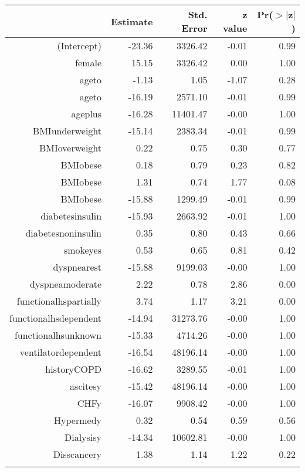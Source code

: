 \bigskip\bigskip
\centering
\begin{tabular}{rrrrr}
  \hline
 & Estimate & Std. Error & z value & Pr($>$$|$z$|$) \\ 
  \hline
(Intercept) & -23.36 & 3326.42 & -0.01 & 0.99 \\ 
  female & 15.15 & 3326.42 & 0.00 & 1.00 \\ 
  age\-65\-to\-74 & -1.13 & 1.05 & -1.07 & 0.28 \\ 
  age\-75\-to\-84 & -16.19 & 2571.10 & -0.01 & 0.99 \\ 
  age\-85\-plus & -16.28 & 11401.47 & -0.00 & 1.00 \\ 
  BMI\-underweight & -15.14 & 2383.34 & -0.01 & 0.99 \\ 
  BMI\-overweight & 0.22 & 0.75 & 0.30 & 0.77 \\ 
  BMI\-obese\-1 & 0.18 & 0.79 & 0.23 & 0.82 \\ 
  BMI\-obese\-2 & 1.31 & 0.74 & 1.77 & 0.08 \\ 
  BMI\-obese\-3 & -15.88 & 1299.49 & -0.01 & 0.99 \\ 
  diabetes\-insulin & -15.93 & 2663.92 & -0.01 & 1.00 \\ 
  diabetes\-noninsulin & 0.35 & 0.80 & 0.43 & 0.66 \\ 
  smoke\-yes & 0.53 & 0.65 & 0.81 & 0.42 \\ 
  dyspnea\-rest & -15.88 & 9199.03 & -0.00 & 1.00 \\ 
  dyspnea\-moderate & 2.22 & 0.78 & 2.86 & 0.00 \\ 
  functional\-hs\-partially & 3.74 & 1.17 & 3.21 & 0.00 \\ 
  functional\-hs\-dependent & -14.94 & 31273.76 & -0.00 & 1.00 \\ 
  functional\-hs\-unknown & -15.33 & 4714.26 & -0.00 & 1.00 \\ 
  ventilator\-dependent & -16.54 & 48196.14 & -0.00 & 1.00 \\ 
  history\-COPD & -16.62 & 3289.55 & -0.01 & 1.00 \\ 
  ascites\-y & -15.42 & 48196.14 & -0.00 & 1.00 \\ 
  CHF\-y & -16.07 & 9908.42 & -0.00 & 1.00 \\ 
  Hyper\-med\-y & 0.32 & 0.54 & 0.59 & 0.56 \\ 
  Dialysis\-y & -14.34 & 10602.81 & -0.00 & 1.00 \\ 
  Diss\-cancer\-y & 1.38 & 1.14 & 1.22 & 0.22 \\ 
$$
\end{tabular}
